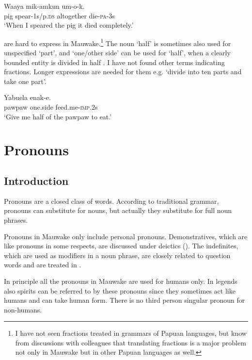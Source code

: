 \ea%
\label{ex:3:x513}
\gll Waaya mik-amkun  um-o-k. \\
pig spear-1s/p.\textsc{ds} altogether die-\textsc{pa}-3s\\
\glt`When I speared the pig it died completely.'
\z

 are hard to express in Mauwake.\footnote{I have not seen fractions treated in grammars of Papuan languages, but know from discussions with colleagues that translating fractions is a major problem not only in Mauwake but in other Papuan languages as well.} The noun  `half' is sometimes also used for unspecified `part', and  `one/other side' can be used for `half', when a clearly bounded entity is divided in half . I have not found other terms indicating fractions. Longer expressions are needed for them e.g. `divide into ten parts and take one part'.

\ea%
\label{ex:3:x104}
\gll Yabuela  enak-e. \\
pawpaw one.side feed.me-\textsc{imp}.2s\\
\glt`Give me half of the pawpaw to eat.'
\z

\section{Pronouns}\label{sec:3:5}\footnotemark{}
{}
\subsection{Introduction}\label{sec:3:y:x}
{}
Pronouns are a closed class of words. According to traditional grammar, pronouns can substitute for nouns, but actually they substitute for full noun phrases. 

Pronouns in Mauwake only include personal pronouns. Demonstratives, which are like pronouns in some respects, are discussed under deictics (). The indefinites, which are used as modifiers in a noun phrase, are closely related to question words and are treated in .

In principle all the pronouns in Mauwake are used for humans only. In legends also spirits can be referred to by these pronouns since they sometimes act like humans and can take human form. There is no third person singular pronoun for non-humans. 

